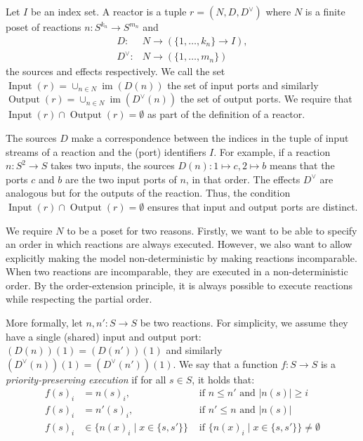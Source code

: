 \begin{defn}[Reactor]
\label{defn:reactor}
Let $I$ be an index set. A reactor is a tuple $r = (N,D,D^\vee)$  where $N$ is a finite \ac{poset} of reactions $n : S^{k_n} \rightarrow S^{m_n}$ and
 \begin{align*} D : & N \rightarrow (\{1, \ldots, k_n\} \rightarrow I), \\
     D^\vee : & N \rightarrow (\{1, \ldots, m_n\})
 \end{align*} the sources and effects respectively.
We call the set $\operatorname{Input}(r) = \cup_{ n \in N} \operatorname{im}(D(n))$ the set of input ports and 
similarly $\operatorname{Output}(r) = \cup_{ n \in N} \operatorname{im}(D^\vee(n))$ the set of output ports.
We require that $\operatorname{Input}(r) \cap \operatorname{Output}(r) = \emptyset$ as part of the definition of a reactor.
\end{defn}

The sources $D$ make a correspondence between the indices in the tuple of input streams of a reaction and the (port) identifiers $I$.
For example, if a reaction $n : S^2 \rightarrow S$ takes two inputs, the sources $D(n) : 1 \mapsto c, 2 \mapsto b$ means that the ports $c$ and $b$ are the two input ports of $n$, in that order.
The effects $D^\vee$ are analogous but for the outputs of the reaction.
Thus, the condition $\operatorname{Input}(r) \cap \operatorname{Output}(r) = \emptyset$ ensures that input and output ports are distinct.

We require $N$ to be a \ac{poset} for two reasons.
Firstly, we want to be able to specify an order in which reactions are always executed.
However, we also want to allow explicitly making the model non-deterministic by making reactions incomparable. 
When two reactions are incomparable, they are executed in a non-deterministic order.
By the order-extension principle, it is always possible to execute reactions while respecting the partial order.

More formally, let $n, n' : S \rightarrow S$ be two reactions.
For simplicity, we assume they have a single (shared) input and output port: $(D(n))(1) = (D(n'))(1)$ and similarly $(D^\vee(n))(1) = (D^\vee(n'))(1)$.
We say that a function $f : S \rightarrow S$ is a \emph{priority-preserving execution} if for all $s \in S$, it holds that:
\begin{align}
\label{eqn:nleqns} f(s)_i &  =  n(s)_i, & \text{ if } n \leq n' \text{ and } |n(s)| \geq i  \\ 
\label{eqn:nsleqn} f(s)_i &  =  n'(s)_i, & \text{ if } n' \leq n \text{ and } | n(s)| \\
\label{eqn:nondet} f(s)_i &  \in \{ n(x)_i \mid x \in \{s,s'\} \} & \text{ if } \{ n(x)_i \mid x \in \{s,s'\} \} \neq \emptyset \\
\end{align}


